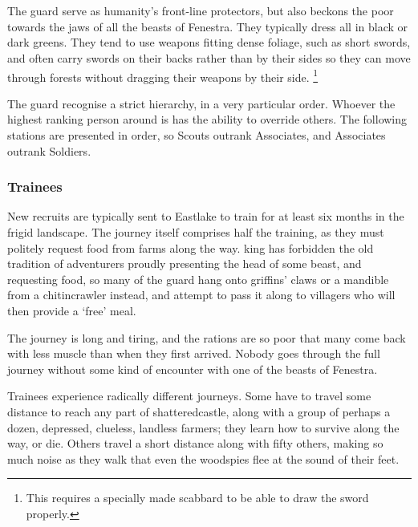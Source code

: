 \chapter{}

\label{guard}

\begin{multicols}{2}

\noindent
The \Gls{guard} serve as humanity's front-line protectors, but also beckons the poor towards the jaws of all the beasts of Fenestra.
They typically dress all in black or dark greens.
They tend to use weapons fitting dense foliage, such as short swords, and often carry swords on their backs rather than by their sides so they can move through forests without dragging their weapons by their side.%
\footnote{This requires a specially made scabbard to be able to draw the sword properly.}

The \Gls{guard} recognise a strict hierarchy, in a very particular order.
Whoever the highest ranking person around is has the ability to override others.
The following stations are presented in order, so Scouts outrank Associates, and Associates outrank Soldiers.

\subsection{Trainees}

New recruits are typically sent to Eastlake to train for at least six months in the frigid landscape.
The journey itself comprises half the training, as they must politely request food from farms along the way.
\Gls{king} has forbidden the old tradition of adventurers proudly presenting the head of some beast, and requesting food, so many of the guard hang onto griffins' claws or a mandible from a chitincrawler instead, and attempt to pass it along to villagers who will then provide a `free' meal.

The journey is long and tiring, and the rations are so poor that many come back with less muscle than when they first arrived.
Nobody goes through the full journey without some kind of encounter with one of the beasts of Fenestra.

Trainees experience radically different journeys.
Some have to travel some distance to reach any part of \gls{shatteredcastle}, along with a group of perhaps a dozen, depressed, clueless, landless farmers; they learn how to survive along the way, or die.
Others travel a short distance along with fifty others, making so much noise as they walk that even the woodspies flee at the sound of their feet.


\end{multicols}
